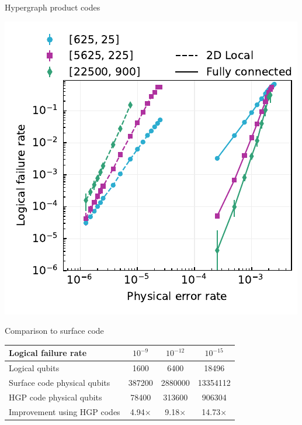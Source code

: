 \begin{frame}[c]{Hypergraph product codes}
\end{frame}

\begin{frame}[c]
    \centering 
    \includegraphics{figs/comparison_alt.pdf}
\end{frame}

\begin{frame}[c]{Comparison to surface code}
  \centering
  \begin{tabular} { l c c c }
      Logical failure rate & $10^{-9}$ & $10^{-12}$ & $10^{-15}$ \\
      \hline
      Logical qubits & \num{1600} & \num{6400} & \num{18496} \\
      Surface code physical qubits & \num{387200} & \num{2880000}  & \num{13354112} \\
      HGP code physical qubits & \num{78400}   & \num{313600}   & \num{906304} \\
      Improvement using HGP codes & \num{4.94}$\times$   & \num{9.18}$\times$  & \num{14.73}$\times$ \\
  \end{tabular}
\end{frame}

